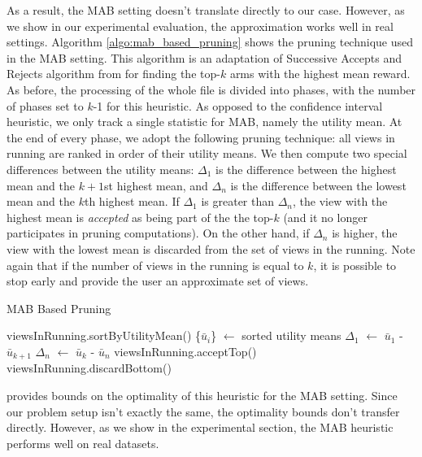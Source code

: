 As a result, the MAB setting doesn't translate directly to our case. 
However, as we show in our experimental evaluation, the approximation works well
in real settings.
Algorithm \ref{algo:mab_based_pruning} shows the pruning technique used in the
MAB setting.
This
algorithm is an adaptation of Successive Accepts and Rejects
algorithm from \cite{BubeckWV13} for finding the top-$k$ arms with the highest
mean reward.
As before, the processing of the whole file is divided into phases, with the
number of phases set to $k$-1 for this heuristic.
As opposed to the confidence interval heuristic, we only track a single
statistic for MAB, namely the utility mean.
At the end of every phase, we adopt the following pruning technique: all views
in running are ranked in order of their utility means. 
We then compute two special differences between the utility means: $\Delta_1$
is the difference between the highest mean and the $k+1$st highest mean, and
$\Delta_n$ is the difference between the lowest mean and the $k$th highest mean.
If $\Delta_1$ is greater than $\Delta_n$, the view with the highest mean is
{\it accepted} as being part of the the top-$k$ (and it no longer participates
in pruning computations).
On the other hand, if $\Delta_n$ is higher, the view with the lowest mean is discarded
from the set of views in the running.
Note again that if the number of views in the running is equal to $k$, it is
possible to stop early and provide the user an approximate set of views.

\begin{algorithm}
\caption{MAB Based Pruning}
\label{algo:mab_based_pruning}
\begin{algorithmic}[1]
\State viewsInRunning.sortByUtilityMean()
\State \{$\bar{u}_{i}$\} $\gets$ sorted utility means
\State $\Delta_1$ $\gets$ $\bar{u}_{1}$ - $\bar{u}_{k+1}$
\State $\Delta_n$ $\gets$ $\bar{u}_{k}$ - $\bar{u}_{n}$
\State viewsInRunning.acceptTop()
\Else
\State viewsInRunning.discardBottom()
\EndIf
\end{algorithmic}
\end{algorithm}

\cite{BubeckWV13} provides bounds on the optimality of this heuristic for the
MAB setting.
Since our problem setup isn't exactly the same, the optimality bounds don't
transfer directly.
However, as we show in the experimental section, the MAB heuristic performs well
on real datasets.

